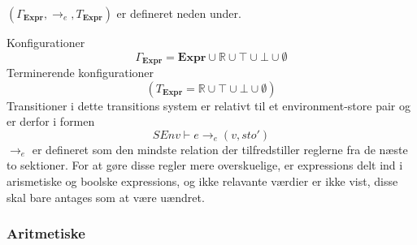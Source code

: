 $(\Gamma_\textbf{Expr},\to_e,T_\textbf{Expr})$ er defineret neden under.

Konfigurationer
\[
    \Gamma_\textbf{Expr} = \textbf{Expr} \cup \mathbb{R} \cup \top \cup \bot \cup \emptyset 
\]
Terminerende konfigurationer
\[
    (T_\textbf{Expr}=\mathbb{R}\cup\top\cup\bot\cup \emptyset)
\]
Transitioner i dette transitions system er relativt til et environment-store pair og er derfor i formen
\[
    SEnv \vdash e \to_e (v, sto')
\]
$\to_e$ er defineret som den mindste relation der tilfredstiller reglerne fra de næste to sektioner. For at gøre disse regler mere overskuelige, er expressions delt ind i arismetiske og boolske expressions, og ikke relavante værdier er ikke vist, disse skal bare antages som at være uændret.\\

\noindent \subsubsection{Aritmetiske}
\label{ssec:aexpr}

